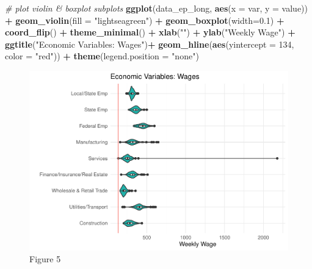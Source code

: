 \documentclass[]{article}
\newenvironment{Shaded}{\begin{snugshade}}{\end{snugshade}}
\newcommand{\CommentTok}[1]{\textcolor[rgb]{0.56,0.35,0.01}{\textit{#1}}}
\newcommand{\DataTypeTok}[1]{\textcolor[rgb]{0.13,0.29,0.53}{#1}}
\newcommand{\DecValTok}[1]{\textcolor[rgb]{0.00,0.00,0.81}{#1}}
\newcommand{\FloatTok}[1]{\textcolor[rgb]{0.00,0.00,0.81}{#1}}
\newcommand{\KeywordTok}[1]{\textcolor[rgb]{0.13,0.29,0.53}{\textbf{#1}}}
\newcommand{\NormalTok}[1]{#1}
\newcommand{\OperatorTok}[1]{\textcolor[rgb]{0.81,0.36,0.00}{\textbf{#1}}}
\newcommand{\StringTok}[1]{\textcolor[rgb]{0.31,0.60,0.02}{#1}}
\begin{document}
\begin{Shaded}
\begin{Highlighting}[]
\CommentTok{# plot violin & boxplot subplots }
\KeywordTok{ggplot}\NormalTok{(data_ep_long, }\KeywordTok{aes}\NormalTok{(}\DataTypeTok{x =}\NormalTok{ var, }\DataTypeTok{y =}\NormalTok{ value)) }\OperatorTok{+}
\StringTok{  }\KeywordTok{geom_violin}\NormalTok{(}\DataTypeTok{fill =} \StringTok{"lightseagreen"}\NormalTok{) }\OperatorTok{+}\StringTok{ }
\StringTok{  }\KeywordTok{geom_boxplot}\NormalTok{(}\DataTypeTok{width=}\FloatTok{0.1}\NormalTok{) }\OperatorTok{+}
\StringTok{  }\KeywordTok{coord_flip}\NormalTok{() }\OperatorTok{+}\StringTok{ }
\StringTok{  }\KeywordTok{theme_minimal}\NormalTok{() }\OperatorTok{+}
\StringTok{  }\KeywordTok{xlab}\NormalTok{(}\StringTok{""}\NormalTok{) }\OperatorTok{+}\StringTok{ }
\StringTok{  }\KeywordTok{ylab}\NormalTok{(}\StringTok{"Weekly Wage"}\NormalTok{) }\OperatorTok{+}
\StringTok{  }\KeywordTok{ggtitle}\NormalTok{(}\StringTok{"Economic Variables: Wages"}\NormalTok{)}\OperatorTok{+}
\StringTok{  }\KeywordTok{geom_hline}\NormalTok{(}\KeywordTok{aes}\NormalTok{(}\DataTypeTok{yintercept =} \DecValTok{134}\NormalTok{, }\DataTypeTok{color =} \StringTok{"red"}\NormalTok{)) }\OperatorTok{+}
\StringTok{  }\KeywordTok{theme}\NormalTok{(}\DataTypeTok{legend.position =} \StringTok{"none"}\NormalTok{)}
\end{Highlighting}
\end{Shaded}

\begin{figure}

{\centering \includegraphics{lab_3_v7_files/figure-latex/unnamed-chunk-19-1} 

}

\caption{Figure 5}\label{fig:unnamed-chunk-19}
\end{figure}
\end{document}
